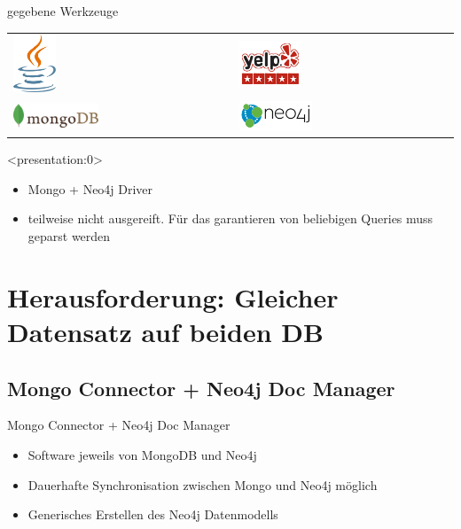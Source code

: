 \documentclass[12pt,usenames,dvipsnames]{beamer}
\begin{document}
		\begin{frame}{gegebene Werkzeuge}
		\begin{table}[]
\begin{tabular}{ll}
\includegraphics[width=0.2\textwidth]{java}  & \includegraphics[width=0.3\textwidth]{yelp} \\
\includegraphics[width=0.4\textwidth]{mongodb}  & \includegraphics[width=0.35\textwidth]{neo4j}
\end{tabular}
\end{table}
	\end{frame}
\begin{frame}<presentation:0>
\begin{itemize}
\item Mongo + Neo4j Driver
\item teilweise nicht ausgereift. Für das garantieren von beliebigen Queries muss geparst werden
\end{itemize}
\end{frame}
\section{Herausforderung: Gleicher Datensatz auf beiden DB}
\subsection{Mongo Connector + Neo4j Doc Manager}
\begin{frame}{Mongo Connector + Neo4j Doc Manager}
\begin{itemize}[<+- | alert@+>]
\item Software jeweils von MongoDB und Neo4j
\item Dauerhafte Synchronisation zwischen Mongo und Neo4j möglich
\item Generisches Erstellen des Neo4j Datenmodells 
\end{itemize}
\end{frame}
\end{document}
